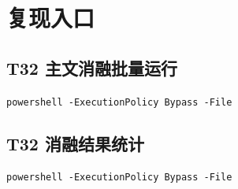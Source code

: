 \documentclass[12pt,a4paper]{ctexart}
\begin{document}
\section{复现入口}
\subsection{T32 主文消融批量运行}
\begin{center}
\texttt{powershell -ExecutionPolicy Bypass -File}\\
\end{center}

\subsection{T32 消融结果统计}
\begin{center}
\texttt{powershell -ExecutionPolicy Bypass -File}\\
\end{center}
\end{document}

